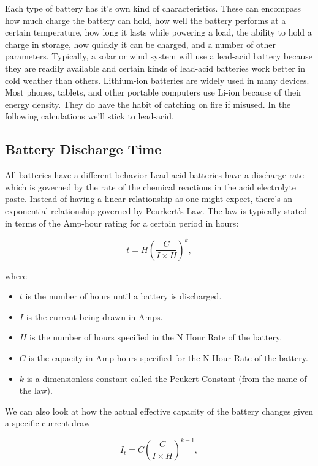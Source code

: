 \documentclass[
10pt, %
letterpaper, %
oneside, %
headinclude,footinclude, %
BCOR5mm, %
]{scrartcl}
\begin{document}
Each type of battery has it's own kind of characteristics. These can encompass how much charge the battery can hold, how well the battery performs at a certain temperature, how long it lasts while powering a load, the ability to hold a charge in storage, how quickly it can be charged, and a number of other parameters. Typically, a solar or wind system will use a lead-acid battery because they are readily available and certain kinds of lead-acid batteries work better in cold weather than others. Lithium-ion batteries are widely used in many devices. Most phones, tablets, and other portable computers use Li-ion because of their energy density. They do have the habit of catching on fire if misused. In the following calculations we'll stick to lead-acid.

\subsection{Battery Discharge Time}
All batteries have a different behavior Lead-acid batteries have a discharge rate which is governed by the rate of the chemical reactions in the acid electrolyte paste. Instead of having a linear relationship as one might expect, there's an exponential relationship governed by Peurkert's Law. The law is typically stated in terms of the Amp-hour rating for a certain period in hours:

\begin{equation}
t = H\left(\frac{C}{I \times H}\right)^k,
\label{eq:3}
\end{equation}

where
\begin{itemize}
\item $t$ is the number of hours until a battery is discharged.
\item $I$ is the current being drawn in Amps.
\item $H$ is the number of hours specified in the N Hour Rate of the battery.
\item $C$ is the capacity in Amp-hours specified for the N Hour Rate of the battery.
\item $k$ is a dimensionless constant called the Peukert Constant (from the name of the law).
\end{itemize}

We can also look at how the actual effective capacity of the battery changes given a specific current draw

\begin{equation}
I_t = C\left(\frac{C}{I \times H}\right)^{k-1},
\label{eq:4}
\end{equation}
\end{document}

